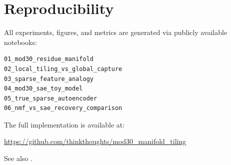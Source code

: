 \documentclass[11pt]{article}
\begin{document}
\section{Reproducibility}

All experiments, figures, and metrics are generated via publicly available notebooks:

\begin{verbatim}
01_mod30_residue_manifold
02_local_tiling_vs_global_capture
03_sparse_feature_analogy
04_mod30_sae_toy_model
05_true_sparse_autoencoder
06_nmf_vs_sae_recovery_comparison
\end{verbatim}

The full implementation is available at:

\begin{center}
\url{https://github.com/thinkthoughts/mod30_manifold_tiling}
\end{center}

See also \cite{mod30_repo}.



\end{document}
